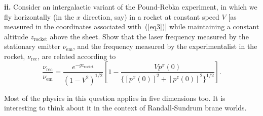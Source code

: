 \documentclass[a4paper]{article} %
\begin{document}
\begin{framed}
\textbf{ii.} Consider an intergalactic variant of the Pound-Rebka experiment, in which we fly horizontally (in the $x$ direction, say) in a rocket at constant speed $V$ [as measured in the coordinates associated with~(\ref{eq3})] while maintaining a constant altitude $z_{\text{rocket}}$ above the sheet. Show that the laser frequency measured by the stationary emitter $\nu_{\text{em}}$, and the frequency measured by the experimentalist in the rocket, $\nu_{\text{rec}}$, are related according to
\begin{equation}
\frac{\nu_{\text{rec}}}{\nu_{\text{em}}}=\frac{e^{-gz_{\text{rocket}}}}{(1-V^2)^{1/2}}
\left[1-\frac{Vp^x(0)}{\{[p^x(0)]^2+[p^z(0)]^2\}^{1/2}}\right].
\end{equation}

Most of the physics in this question applies in five dimensions too. It is interesting to think about it in the context of Randall-Sundrum brane worlds.
\end{framed}
\end{document}
